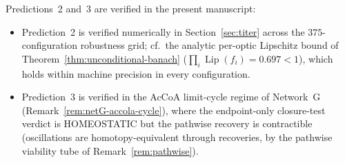 \documentclass[11pt,a4paper]{article}
\theoremstyle{plain}
\theoremstyle{definition}
\theoremstyle{remark}
\DeclareMathOperator{\Lip}{Lip}
\begin{document}
\noindent Predictions~2 and~3 are verified in the present manuscript:

\begin{itemize}[leftmargin=*, itemsep=2pt]
\item Prediction~2 is verified numerically in Section~\ref{sec:titer}
across the $375$-configuration robustness grid; cf.\ the analytic
per-optic Lipschitz bound of Theorem~\ref{thm:unconditional-banach}
($\prod_i \Lip(f_i) = 0.697 < 1$), which holds within machine
precision in every configuration.
\item Prediction~3 is verified in the AcCoA limit-cycle regime of
Network~G (Remark~\ref{rem:netG-accola-cycle}), where the
endpoint-only closure-test verdict is HOMEOSTATIC but the pathwise
recovery is contractible (oscillations are homotopy-equivalent through
recoveries, by the pathwise viability tube of Remark~\ref{rem:pathwise}).
\end{itemize}
\end{document}
